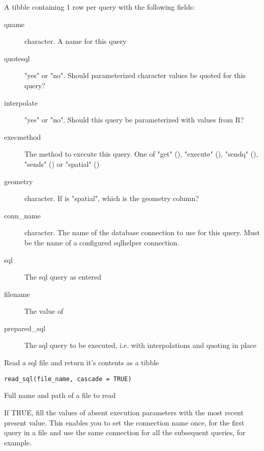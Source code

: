 \documentclass[a4paper]{book}
\begin{document}
\begin{Value}
A tibble containing 1 row per query with the following fields:
\begin{description}

\item[qname] character. A name for this query
\item[quotesql] "yes" or "no". Should parameterized character values be quoted for this query?
\item[interpolate] "yes" or "no". Should this query be parameterized with values from R?
\item[execmethod] The method to execute this query.
One of "get" (), "execute" (), "sendq" (), "sends" () or "spatial" ()
\item[geometry] character. If  is "spatial", which is the geometry column?
\item[conn\_name] character. The name of the database connection to use for this query.
Must be the name of a configured sqlhelper connection.
\item[sql] The sql query as entered
\item[filename] The value of 
\item[prepared\_sql] The sql query to be executed, i.e. with interpolations
and quoting in place

\end{description}

\end{Value}
%
\begin{Description}\relax
Read a sql file and return it's contents as a tibble
\end{Description}
%
\begin{Usage}
\begin{verbatim}
read_sql(file_name, cascade = TRUE)
\end{verbatim}
\end{Usage}
%
\begin{Arguments}
\begin{ldescription}
\item[\code{file\_name}] Full name and path of a file to read

\item[\code{cascade}] If TRUE, fill the values of absent execution parameters with
the most recent present value. This enables you to set the connection name
once, for the first query in a file and use the same connection for all the
subsequent queries, for example.
\end{ldescription}
\end{Arguments}
\end{document}
